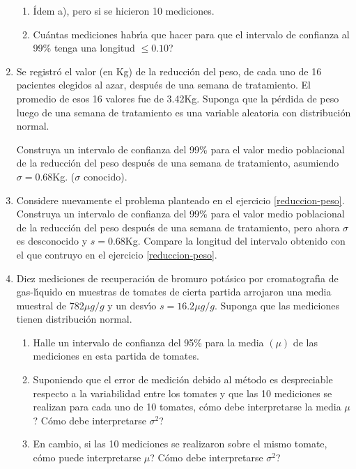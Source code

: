 \documentclass[11pt,a4paper,twoside]{article}%
\begin{document}
\begin{enumerate}
\begin{enumerate}
	\item \'{I}dem a), pero si se hicieron 10 mediciones.
	
	\item \textquestiondown Cu\'{a}ntas mediciones habr\'{\i}a que hacer para que
	el intervalo de confianza al 99\% tenga una longitud $\leq0.10$?
\end{enumerate}


\item \label{reduccion-peso} Se registr\'{o} el valor (en Kg) de la reducci\'{o}n del peso, de cada
uno de 16 pacientes elegidos al azar, despu\'{e}s de una semana de
tratamiento. El promedio de esos 16 valores fue de 3.42Kg. Suponga que la
p\'{e}rdida de peso luego de una semana de tratamiento es una variable
aleatoria con distribuci\'{o}n normal.

 Construya un intervalo de confianza del 99\% para el valor medio
poblacional de la reducci\'{o}n del peso despu\'{e}s de una semana de tratamiento, asumiendo  $\sigma=0.68$Kg. ($\sigma$ conocido). 


\item Considere nuevamente el problema planteado en el ejercicio \ref{reduccion-peso}. Construya un intervalo de confianza del 99\% para el valor medio
poblacional de la reducci\'{o}n del peso despu\'{e}s de una semana de tratamiento, pero ahora $\sigma$  es desconocido  y $s=0.68$Kg.
 Compare la longitud del  intervalo obtenido con el que contruyo en el ejercicio  \ref{reduccion-peso}. 


\item Diez mediciones de recuperaci\'{o}n de bromuro pot\'{a}sico por
cromatograf\'{\i}a de gas-l\'{\i}quido en muestras de tomates de cierta
partida arrojaron una media muestral de 782$\mu g/g$ y un desv\'{\i}o
$s=16.2\mu g/g$. Suponga que las mediciones tienen distribuci\'{o}n normal.

\begin{enumerate}
\item Halle un intervalo de confianza del 95\% para la media $\left(
\mu\right)  $ de las mediciones en esta partida de tomates.

\item Suponiendo que el error de medici\'{o}n debido al m\'{e}todo es
despreciable respecto a la variabilidad entre los tomates y que las 10
mediciones se realizan para cada uno de 10 tomates, \textquestiondown c\'{o}mo
debe interpretarse la media $\mu$? \textquestiondown C\'{o}mo debe
interpretarse $\sigma^{2}$?

\item En cambio, si las 10 mediciones se realizaron sobre el mismo tomate,
\textquestiondown c\'{o}mo puede interpretarse $\mu$?
\textquestiondown C\'{o}mo debe interpretarse $\sigma^{2}$?


\end{enumerate}
\end{enumerate}
\end{document}

